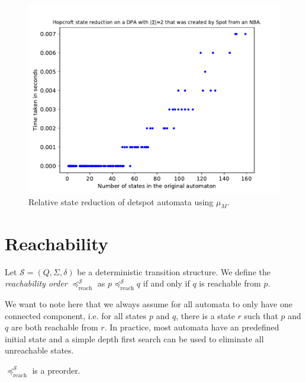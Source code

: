 \begin{figure}
	\centering
	\includegraphics[page=2,height=.4\textheight]{../data/analysis/hopcroft/detspot_ap1.pdf} 
	\caption{Relative state reduction of \textsf{detspot} automata using $\mu_M$.}
	\label{fig:general:empirical_moore_reduct_abs}
\end{figure}



\vspace{5pt}





\section{Reachability}

\begin{defn}
	Let $\mathcal{S} = (Q, \Sigma, \delta)$ be a deterministic transition structure. We define the \emph{reachability order} $\preceq_\text{reach}^\mathcal{S}$ as $p \preceq_\text{reach}^\mathcal{S} q$ if and only if $q$ is reachable from $p$. 
\end{defn}

We want to note here that we always assume for all automata to only have one connected component, i.e. for all states $p$ and $q$, there is a state $r$ such that $p$ and $q$ are both reachable from $r$. In practice, most automata have an predefined initial state and a simple depth first search can be used to eliminate all unreachable states.

\begin{lem}
	$\preceq_\text{reach}^\mathcal{S}$ is a preorder.
\end{lem}

